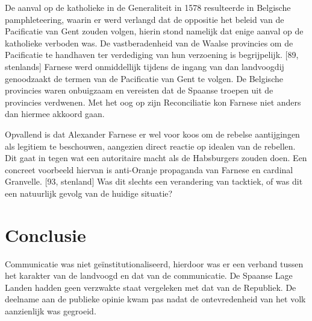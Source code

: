 \documentclass[11pt]{amsart}
\begin{document}
De aanval op de katholieke in de Generaliteit in 1578 resulteerde in Belgische pamphleteering, waarin er werd verlangd
dat de oppositie het beleid van de Pacificatie van Gent zouden volgen, hierin stond namelijk dat enige aanval op de
katholieke verboden was. De vastberadenheid van de Waalse provincies om de Pacificatie te handhaven ter verdediging van
hun verzoening is begrijpelijk. [89, stenlands] Farnese werd onmiddellijk tijdens de ingang van dan landvoogdij
genoodzaakt de termen van de Pacificatie van Gent te volgen. De Belgische provincies waren onbuigzaam en vereisten dat
de Spaanse troepen uit de provincies verdwenen. Met het oog op zijn Reconciliatie kon Farnese niet anders dan hiermee
akkoord gaan.

Opvallend is dat Alexander Farnese er wel voor koos om de rebelse aantijgingen als legitiem te beschouwen, aangezien
direct reactie op idealen van de rebellen. Dit gaat in tegen wat een autoritaire macht als de Habsburgers zouden doen.
Een concreet voorbeeld hiervan is anti-Oranje propaganda van Farnese en cardinal Granvelle. [93, stenland] Was dit
slechts een verandering van tacktiek, of was dit een natuurlijk gevolg van de huidige situatie?

\section*{Conclusie} Communicatie was niet geïnstitutionaliseerd, hierdoor was er een verband tussen het karakter van
de landvoogd en dat van de communicatie. De Spaanse Lage Landen hadden geen verzwakte staat vergeleken met dat van de
Republiek. De deelname aan de publieke opinie kwam pas nadat de ontevredenheid van het volk aanzienlijk was gegroeid.

\newpage\printbibliography{}
\end{document}
